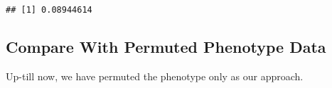 \documentclass[]{article}
\newenvironment{Shaded}{\begin{snugshade}}{\end{snugshade}}
\newcommand{\KeywordTok}[1]{\textcolor[rgb]{0.13,0.29,0.53}{\textbf{#1}}}
\newcommand{\StringTok}[1]{\textcolor[rgb]{0.31,0.60,0.02}{#1}}
\newcommand{\OperatorTok}[1]{\textcolor[rgb]{0.81,0.36,0.00}{\textbf{#1}}}
\newcommand{\NormalTok}[1]{#1}
\begin{document}
\begin{Shaded}
\end{Shaded}

\begin{verbatim}
## [1] 0.08944614
\end{verbatim}

\subsection{Compare With Permuted Phenotype
Data}\label{compare-with-permuted-phenotype-data}

Up-till now, we have permuted the phenotype only as our approach.
\end{document}
